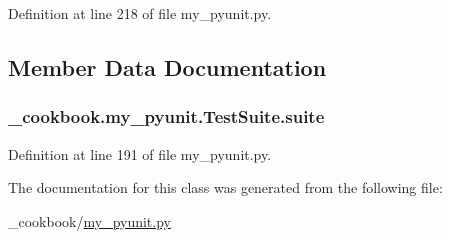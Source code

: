 Definition at line 218 of file my\-\_\-pyunit.\-py.



\subsection{Member Data Documentation}
\hypertarget{class__cookbook_1_1my__pyunit_1_1TestSuite_aa72351c9916112e29864390633a480a0}{
\subsubsection[{suite}]{\setlength{\rightskip}{0pt plus 5cm}\-\_\-cookbook.\-my\-\_\-pyunit.\-Test\-Suite.\-suite}}\label{class__cookbook_1_1my__pyunit_1_1TestSuite_aa72351c9916112e29864390633a480a0}


Definition at line 191 of file my\-\_\-pyunit.\-py.



The documentation for this class was generated from the following file\-:\begin{DoxyCompactItemize}
\item 
\-\_\-cookbook/\hyperlink{my__pyunit_8py}{my\-\_\-pyunit.\-py}\end{DoxyCompactItemize}
